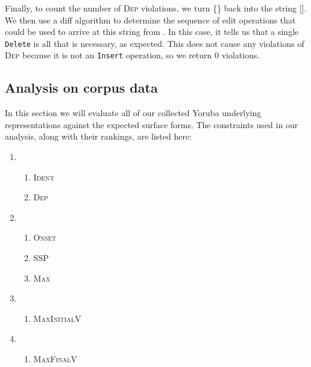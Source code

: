 \documentclass[12pt]{article}
\newcommand{\ident}{\textsc{Ident}}
\newcommand{\maxvplus}{\textsc{MaxFinalV}}
\newcommand{\maxplusv}{\textsc{MaxInitialV}}
\newcommand{\maxc}{\textsc{Max}}
\newcommand{\ssp}{\textsc{SSP}}
\newcommand{\dep}{\textsc{Dep}}
\newcommand{\onset}{\textsc{Onset}}
\begin{document}
Finally, to count the number of \dep{} violations, we turn
\{\} back into the string
[]. We then use a diff algorithm to determine
the sequence of edit operations that could be used to arrive at this
string from . In this case, it tells us
that a single \texttt{Delete} is all that is necessary, as expected.
This does not cause any violations of \dep{} because it is not an
\texttt{Insert} operation, so we return 0 violations.

\subsection{Analysis on corpus data}

In this section we will evaluate all of our collected Yoruba underlying
representations against the expected surface forms. The constraints
used in our analysis, along with their rankings, are listed here:

\begin{enumerate}
    \item
        \begin{enumerate}
            \item \ident{}
            \item \dep{}
        \end{enumerate}
    \item
        \begin{enumerate}
            \item \onset{}
            \item \ssp{}
            \item \maxc{}
        \end{enumerate}
    \item
        \begin{enumerate}
            \item \maxplusv{}
        \end{enumerate}
    \item
        \begin{enumerate}
            \item \maxvplus{}
        \end{enumerate}
\end{enumerate}
\end{document}
